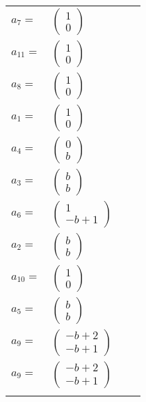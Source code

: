 \documentclass[1p]{elsarticle_modified}
\theoremstyle{definition}
\begin{document}
\begin{tabular}{m{7pt} m{180pt} m{7pt} m{180pt} }
\flushright $a_{7}=$&$\begin{pmatrix}1\\0\end{pmatrix}$ \\
\flushright $a_{11}=$&$\begin{pmatrix}1\\0\end{pmatrix}$ \\
\flushright $a_{8}=$&$\begin{pmatrix}1\\0\end{pmatrix}$ \\
\flushright $a_{1}=$&$\begin{pmatrix}1\\0\end{pmatrix}$ \\
\flushright $a_{4}=$&$\begin{pmatrix}0\\b\end{pmatrix}$ \\
\flushright $a_{3}=$&$\begin{pmatrix}b\\b\end{pmatrix}$ \\
\flushright $a_{6}=$&$\begin{pmatrix}1\\- b+1\end{pmatrix}$ \\
\flushright $a_{2}=$&$\begin{pmatrix}b\\b\end{pmatrix}$ \\
\flushright $a_{10}=$&$\begin{pmatrix}1\\0\end{pmatrix}$ \\
\flushright $a_{5}=$&$\begin{pmatrix}b\\b\end{pmatrix}$ \\
\flushright $a_{9}=$&$\begin{pmatrix}- b+2\\- b+1\end{pmatrix}$\\ \flushright $a_{9}=$&$\begin{pmatrix}- b+2\\- b+1\end{pmatrix}$\\&\end{tabular}
\end{document}
